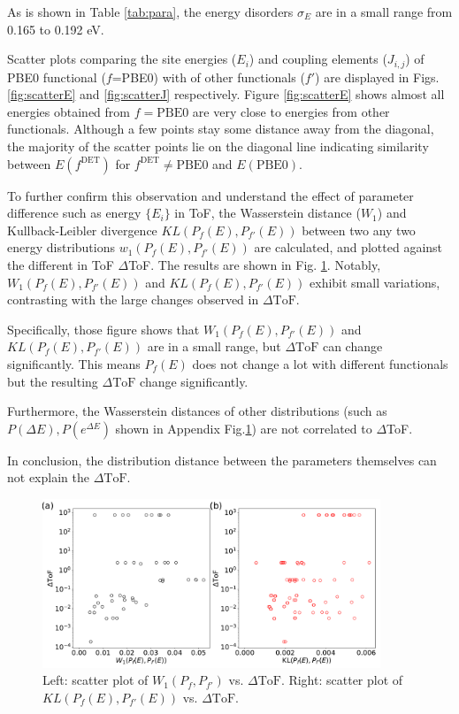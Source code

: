 \documentclass[letterpaper,12pt]{article}
\begin{document}
As is shown in Table \ref{tab:para}, the energy disorders $\sigma_E$ are in a small range from 0.165 to 0.192 eV.

Scatter plots comparing the site energies ($E_i$) and coupling elements ($J_{i,j}$) of PBE0 functional ($f$=PBE0) with of other functionals ($f'$) are displayed in Figs.\ref{fig:scatterE} and \ref{fig:scatterJ}  respectively.
Figure \ref{fig:scatterE} shows almost all energies obtained from $f=\text{PBE0}$ are very close to energies from other functionals. 
Although a few points stay some distance away from the diagonal, the majority of the scatter points lie on the diagonal line indicating similarity between $E(f^\text{DET})$ for $f^\text{DET} \neq \text{PBE0}$ and $E(\text{PBE0})$.



To further confirm this observation and understand the effect of parameter difference such as energy $\{ E_i \}$ in ToF, the Wasserstein distance ($W_1$) and Kullback-Leibler divergence $KL(P_f(E),P_{f'}(E))$ between two any two energy distributions $w_1(P_f(E),P_{f'}(E))$ are calculated, and plotted against the different in ToF $\Delta $ToF. 
The results are shown in Fig. \ref{fig:distance_ToF}. 
Notably, $W_1(P_f(E),P_{f'}(E))$ and $KL(P_f(E),P_{f'}(E))$ exhibit small variations, contrasting with the large changes observed in $\Delta \text{ToF}$.

Specifically, those figure shows that $W_1(P_f(E),P_{f'}(E))$ and $KL(P_f(E),P_{f'}(E))$ are in a small range, but $\Delta \text{ToF}$ can change significantly. This means $P_f(E)$ does not change a lot with different functionals but the resulting $\Delta \text{ToF}$ change significantly.

Furthermore, the Wasserstein distances of other distributions (such as $P(\Delta E), P(e^{\Delta E})$ shown in Appendix Fig.\ref{fig:distance_ToF}) are not correlated to $\Delta$ToF.

In conclusion, the distribution distance between the parameters themselves can not explain the $\Delta \text{ToF}$. 

\begin{figure}
    \centering
    \includegraphics[width=0.9\textwidth]{figs/DeltaToF_W_KL_E.pdf}
    \caption{Left: scatter plot of $W_1(P_f,P_{f'})$ vs. $\Delta \text{ToF}$. 
    Right: scatter plot of  $KL(P_f(E),P_{f'}(E))$ vs. $\Delta \text{ToF}$. }
    \label{fig:distance_ToF}
\end{figure}
\end{document}
